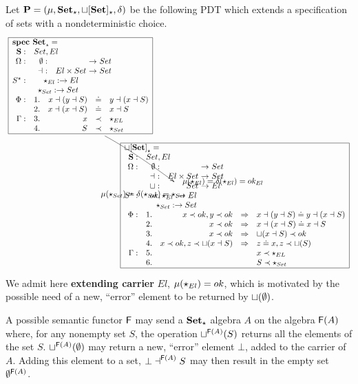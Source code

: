 \begin{example}
Let ${\bf P}=(\mu,{\bf Set}_\star,{\bf \sqcup[Set]_\star},\delta)$ be the
following PDT which extends a specification of sets with a nondeterministic
choice.
\[\xymatrix{
\frame{\txt{$\spec{
\tit{\mbox{\bf spec\ Set}_\cons^{{}}=} \\
	\spSort{Set,El}
	\spOps{\Ops}{
	\emptyset: && Set \\
	\prep\ : & El\times Set & Set 
	}
	\spOps{\allcons}{ \cons_{El}: \to El \\ \cons_{Set}:\to Set}
	\Phi: & 1.& x\prep (y\prep S) & \eleq & y\prep (x\prep S) \\
	      & 2.& x\prep (x\prep S) & \eleq & x\prep S \\
	\Gamma:
	   &3. & x &\prec &\cons_{EL} \\ 
	   &4. & S &\prec &\cons_{Set}
}$}}
\ar@(u,r)[dr]^{\txt{$\large{\hspace*{1em}\mu(\cons_{El})=\delta(\cons_{El})=ok_{El}}$}}_{\txt{$\large{\mu(\cons_{Set})=\delta(\cons_{Set})=
	\cons_{Set}\ \ }$}}
\\ &
\hspace*{-7em}\frame{\txt{$\spec{
\tit{\thr{\choice[Set]}_\cons=} \\
	\spSort{Set,El}
	\spOps{\Ops}{
	\emptyset: && Set \\
	\prep\ : & El\times Set & Set \\
	\choice : & Set & El
	}
	\spOps{\allcons}{ ok,\cons_{El}: \to El \\ \cons_{Set}:\to Set}
	\Phi: & 1.& x\prec ok,y\prec ok &\To & x\prep (y\prep S)  \eleq  y\prep (x\prep S) \\
	      & 2.& x\prec ok & \To & x\prep (x\prep S)  \eleq  x\prep S \\
	      & 3.& x\prec ok & \To & \choice(x\prep S)\prec ok \\
	      & 4.& x\prec ok, z\prec \choice(x\prep S)
	          & \To & z\eleq x, z\prec \choice(S)\\
	\Gamma:
   	    &5. &&& x \prec \cons_{EL} \\ 
	    &6. &&& S\prec \cons_{Set}
}$}}
}
\]
We admit here {\bf extending carrier} $El$, $\mu(\star_{El})=ok$, which is
motivated by the possible need of a new, ``error'' element to be returned by
 $\sqcup(\emptyset)$.

A possible semantic functor ${\sf {F}}$ may send a ${\bf Set}_\star$ algebra $A$ on the
algebra ${\sf {F}}(A)$ where, for any nonempty set $S$, the operation 
$\sqcup^{{\sf {F}}(A)}(S)$ returns all the elements of the set
$S$. $\sqcup^{{\sf {F}}(A)}(\emptyset)$ may return a new, ``error'' element $\bot$,
added to the carrier of $A$. Adding this element to a set, $\bot\mathrel{\small\dashv}^{{\sf {F}}(A)}S$ may then result in
the empty set $\emptyset^{{\sf {F}}(A)}$.


\end{example}
